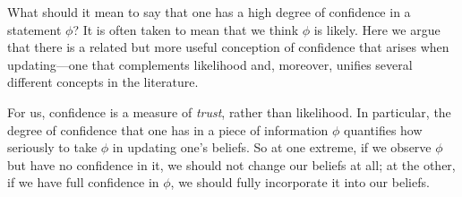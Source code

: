 \def\stmt{$A$}



What should it mean to say that one has a high degree of confidence in a statement $\phi$?  It is often taken to mean that we think $\phi$ is likely. 
Here we argue that there is a related but more useful conception of confidence that arises when updating---one that complements likelihood and, moreover, unifies several different concepts in the literature.

For us, confidence is a measure of \emph{trust}, rather than likelihood.
In particular, the {degree of confidence} that one has in a piece of information $\phi$
quantifies how seriously to take $\phi$ in updating one's beliefs. 
So at one extreme,
if we observe $\phi$ but have no confidence in it, 
we should not change our beliefs at all;
at the other, if we have full confidence in $\phi$,
 we should fully incorporate it into our beliefs.

